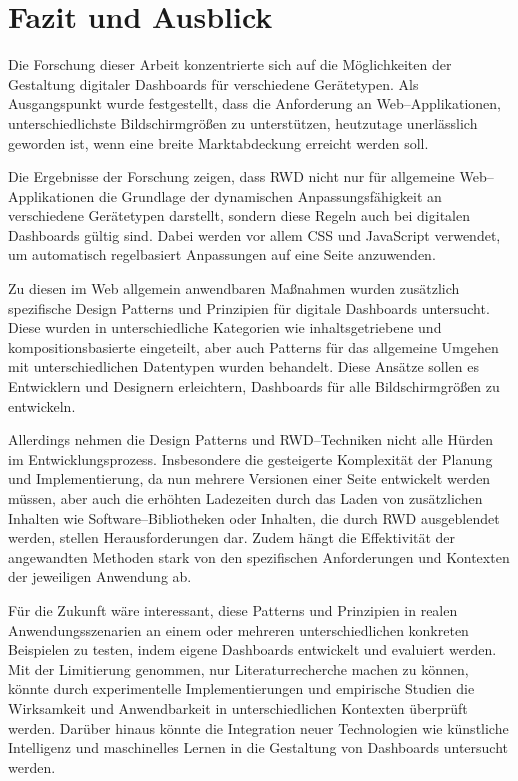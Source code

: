 \section{Fazit und Ausblick}\label{sec:fazit-ausblick}

Die Forschung dieser Arbeit konzentrierte sich auf die Möglichkeiten der Gestaltung digitaler Dashboards für verschiedene Gerätetypen.
Als Ausgangspunkt wurde festgestellt, dass die Anforderung an Web--Applikationen, unterschiedlichste Bildschirmgrößen zu unterstützen, heutzutage unerlässlich geworden ist, wenn eine breite Marktabdeckung erreicht werden soll.

Die Ergebnisse der Forschung zeigen, dass \ac{RWD} nicht nur für allgemeine Web--Applikationen die Grundlage der dynamischen Anpassungsfähigkeit an verschiedene Gerätetypen darstellt, sondern diese Regeln auch bei digitalen Dashboards gültig sind.
Dabei werden vor allem \ac{CSS} und JavaScript verwendet, um automatisch regelbasiert Anpassungen auf eine Seite anzuwenden.

Zu diesen im Web allgemein anwendbaren Maßnahmen wurden zusätzlich spezifische Design Patterns und Prinzipien für digitale Dashboards untersucht.
Diese wurden in unterschiedliche Kategorien wie inhaltsgetriebene und kompositionsbasierte eingeteilt, aber auch Patterns für das allgemeine Umgehen mit unterschiedlichen Datentypen wurden behandelt.
Diese Ansätze sollen es Entwicklern und Designern erleichtern, Dashboards für alle Bildschirmgrößen zu entwickeln.

Allerdings nehmen die Design Patterns und \ac{RWD}--Techniken nicht alle Hürden im Entwicklungsprozess.
Insbesondere die gesteigerte Komplexität der Planung und Implementierung, da nun mehrere Versionen einer Seite entwickelt werden müssen, aber auch die erhöhten Ladezeiten durch das Laden von zusätzlichen Inhalten wie Software--Bibliotheken oder Inhalten, die durch \ac{RWD} ausgeblendet werden, stellen Herausforderungen dar.
Zudem hängt die Effektivität der angewandten Methoden stark von den spezifischen Anforderungen und Kontexten der jeweiligen Anwendung ab.

Für die Zukunft wäre interessant, diese Patterns und Prinzipien in realen Anwendungsszenarien an einem oder mehreren unterschiedlichen konkreten Beispielen zu testen, indem eigene Dashboards entwickelt und evaluiert werden.
Mit der Limitierung genommen, nur Literaturrecherche machen zu können, könnte durch experimentelle Implementierungen und empirische Studien die Wirksamkeit und Anwendbarkeit in unterschiedlichen Kontexten überprüft werden.
Darüber hinaus könnte die Integration neuer Technologien wie künstliche Intelligenz und maschinelles Lernen in die Gestaltung von Dashboards untersucht werden.

